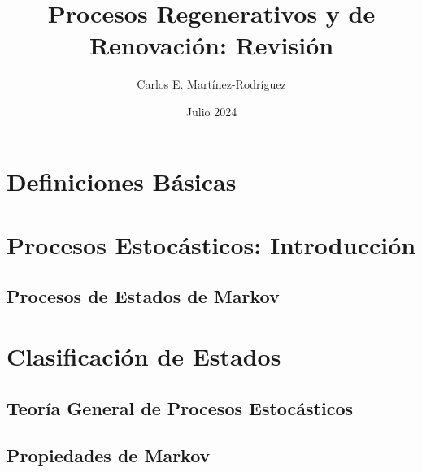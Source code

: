 \documentclass{article}
\title{Procesos Regenerativos y de Renovaci\'on: Revisi\'on}
\author{Carlos E. Martínez-Rodríguez}
\date{Julio 2024}
\begin{document}
\maketitle

\tableofcontents



\section{Definiciones  B\'asicas}

\section{Procesos Estocásticos: Introducción}

\subsection{Procesos de Estados de Markov}

\section{Clasificación de Estados}


\subsection{Teor\'ia General de Procesos Estoc\'asticos}

\subsection{Propiedades de Markov}
\end{document}
